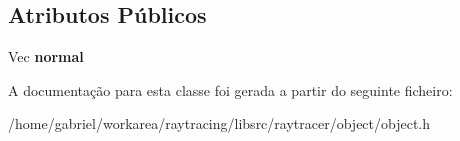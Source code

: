 \subsection*{Atributos Públicos}
\begin{DoxyCompactItemize}
\item 
\mbox{\label{classPlane_a818fe2eba7bff65f6c47d6f83c9cc63f}} 
Vec {\bfseries normal}
\end{DoxyCompactItemize}


A documentação para esta classe foi gerada a partir do seguinte ficheiro\+:\begin{DoxyCompactItemize}
\item 
/home/gabriel/workarea/raytracing/libsrc/raytracer/object/object.\+h\end{DoxyCompactItemize}
